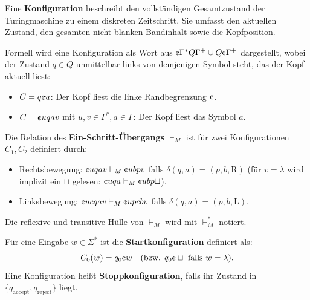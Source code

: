 \begin{definition}
    Eine \textbf{Konfiguration} beschreibt den vollständigen Gesamtzustand der Turingmaschine zu einem diskreten Zeitschritt. Sie umfasst den aktuellen Zustand, den gesamten nicht-blanken Bandinhalt sowie die Kopfposition.
    
    Formell wird eine Konfiguration als Wort aus $\text{\textcent}\Gamma^* Q \Gamma^+ \cup Q\text{\textcent}\Gamma^+$ dargestellt, wobei der Zustand $q \in Q$ unmittelbar links von demjenigen Symbol steht, das der Kopf aktuell liest:
    \begin{itemize}
        \item $C = q \text{\textcent} u$: Der Kopf liest die linke Randbegrenzung $\text{\textcent}$.
        \item $C = \text{\textcent} u q a v$ mit $u, v \in \Gamma^*, a \in \Gamma$: Der Kopf liest das Symbol $a$.
    \end{itemize}
    Die Relation des \textbf{Ein-Schritt-Übergangs} $\vdash_M$ ist für zwei Konfigurationen $C_1, C_2$ definiert durch:
    \begin{itemize}
        \item Rechtsbewegung: $\text{\textcent} u q a v \vdash_M \text{\textcent} u b p v$ falls $\delta(q, a) = (p, b, \mathrm{R})$ (für $v = \lambda$ wird implizit ein $\sqcup$ gelesen: $\text{\textcent} u q a \vdash_M \text{\textcent} u b p \sqcup$).
        \item Linksbewegung: $\text{\textcent} u c q a v \vdash_M \text{\textcent} u p c b v$ falls $\delta(q, a) = (p, b, \mathrm{L})$.
    \end{itemize}
    Die reflexive und transitive Hülle von $\vdash_M$ wird mit $\vdash_M^*$ notiert.
    
    Für eine Eingabe $w \in \Sigma^*$ ist die \textbf{Startkonfiguration} definiert als:
    \[
        C_0(w) = q_0 \text{\textcent} w \quad (\text{bzw. } q_0 \text{\textcent} \sqcup \text{ falls } w = \lambda).
    \]
    Eine Konfiguration heißt \textbf{Stoppkonfiguration}, falls ihr Zustand in $\{q_{\mathrm{accept}}, q_{\mathrm{reject}}\}$ liegt.
\end{definition}

